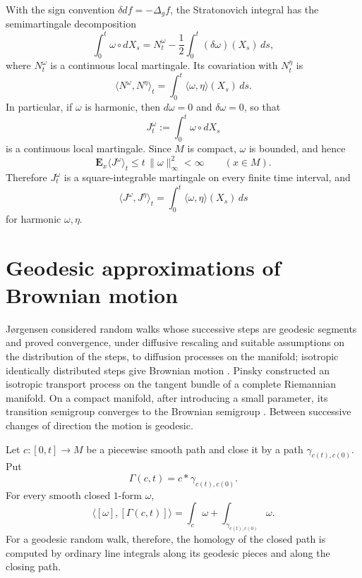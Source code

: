 \documentclass[a4paper,reqno]{amsart}
\theoremstyle{definition}
\begin{document}
With the sign convention $\delta df=-\Delta_g f$, the Stratonovich integral has the semimartingale decomposition
\begin{equation}\label{eq:stratito}
   \int_0^t\omega\circ dX_s
   =N_t^\omega-\frac12\int_0^t(\delta\omega)(X_s)\,ds,
\end{equation}
where $N_t^\omega$ is a continuous local martingale.  Its covariation with $N_t^\eta$ is
\begin{equation}\label{eq:crossvariation}
   \langle N^\omega,N^\eta\rangle_t
   =\int_0^t\langle\omega,\eta\rangle(X_s)\,ds.
\end{equation}
In particular, if $\omega$ is harmonic, then $d\omega=0$ and $\delta\omega=0$, so that
\begin{equation}\label{eq:harmmart}
   J_t^\omega:=\int_0^t\omega\circ dX_s
\end{equation}
is a continuous local martingale.  Since $M$ is compact, $\omega$ is bounded, and hence
\[
\mathbf E_x\langle J^\omega\rangle_t
\le t\,\|\omega\|_\infty^2<\infty
\qquad (x\in M).
\]
Therefore $J_t^\omega$ is a square-integrable martingale on every finite time interval, and
\begin{equation}\label{eq:qv}
   \langle J^\omega,J^\eta\rangle_t
   =\int_0^t\langle\omega,\eta\rangle(X_s)\,ds
\end{equation}
for harmonic $\omega,\eta$.

\section{Geodesic approximations of Brownian motion}\label{sec:geodesic-approx}

J{\o}rgensen considered random walks whose successive steps are geodesic segments and proved convergence, under diffusive rescaling and suitable assumptions on the distribution of the steps, to diffusion processes on the manifold; isotropic identically distributed steps give Brownian motion \cite{Jorgensen}.  Pinsky constructed an isotropic transport process on the tangent bundle of a complete Riemannian manifold.  On a compact manifold, after introducing a small parameter, its transition semigroup converges to the Brownian semigroup \cite{Pinsky}.  Between successive changes of direction the motion is geodesic.

Let $c:[0,t]\to M$ be a piecewise smooth path and close it by a path $\gamma_{c(t),c(0)}$.  Put
\[
   \Gamma(c,t)=c*\gamma_{c(t),c(0)}.
\]
For every smooth closed $1$-form $\omega$,
\begin{equation}\label{eq:broken-geodesic-pairing}
   \bigl\langle[\omega],[\Gamma(c,t)]\bigr\rangle
   =\int_c\omega+\int_{\gamma_{c(t),c(0)}}\omega.
\end{equation}
For a geodesic random walk, therefore, the homology of the closed path is computed by ordinary line integrals along its geodesic pieces and along the closing path.
\end{document}

